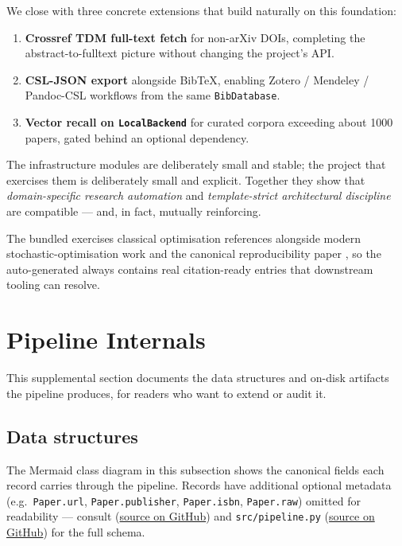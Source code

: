 \documentclass[
]{article}
\providecommand{\tightlist}{%
  \setlength{\itemsep}{0pt}\setlength{\parskip}{0pt}}
\begin{document}
We close with three concrete extensions that build naturally on this
foundation:

\begin{enumerate}
\def\labelenumi{\arabic{enumi}.}
\tightlist
\item
  \textbf{Crossref TDM full-text fetch} for non-arXiv DOIs, completing
  the abstract-to-fulltext picture without changing the project's API.
\item
  \textbf{CSL-JSON export} alongside BibTeX, enabling Zotero / Mendeley
  / Pandoc-CSL workflows from the same \texttt{BibDatabase}.
\item
  \textbf{Vector recall on \texttt{LocalBackend}} for curated corpora
  exceeding about 1000 papers, gated behind an optional
  dependency.
\end{enumerate}

The infrastructure modules are deliberately small and stable; the
project that exercises them is deliberately small and explicit. Together
they show that \emph{domain-specific research automation} and
\emph{template-strict architectural discipline} are compatible --- and,
in fact, mutually reinforcing.

The bundled  exercises classical optimisation
references
\citep{boyd2004convex, nocedal2006numerical, nesterov2013gradient}
alongside modern stochastic-optimisation work
\citep{kingma2014adam, reddi2018convergence} and the canonical
reproducibility paper \citep{peng2011reproducible}, so the
auto-generated  always contains real
citation-ready entries that downstream tooling can resolve.

\newpage

\section{Pipeline Internals}\label{sec:pipeline_internals}

This supplemental section documents the data structures and on-disk
artifacts the pipeline produces, for readers who want to extend or audit
it.

\subsection{Data structures}\label{data-structures}

The Mermaid class diagram in this subsection shows the canonical fields
each record carries through the pipeline. Records have additional
optional metadata (e.g.~\texttt{Paper.url}, \texttt{Paper.publisher},
\texttt{Paper.isbn}, \texttt{Paper.raw}) omitted for readability ---
consult 
(\href{https://github.com/docxology/template/tree/main/infrastructure/search/literature}{source
on GitHub}) and \texttt{src/pipeline.py}
(\href{https://github.com/docxology/template/tree/main/projects/templates/template_search_project/src}{source
on GitHub}) for the full schema.
\end{document}
